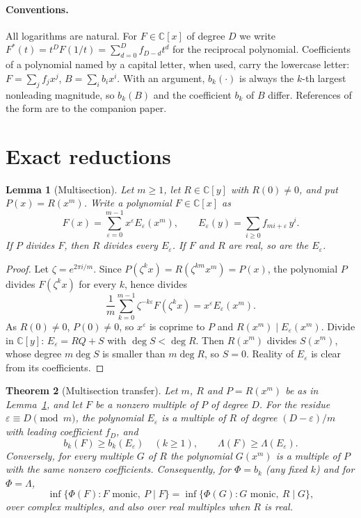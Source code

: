 \documentclass[11pt]{article}
\newtheorem{theorem}{Theorem}[section]
\newtheorem{lemma}[theorem]{Lemma}
\begin{document}
\paragraph{Conventions.}
All logarithms are natural.  For $F\in\mathbb C[x]$ of degree $D$ we write
$F^*(t)=t^DF(1/t)=\sum_{d=0}^Df_{D-d}t^d$ for the reciprocal polynomial.
Coefficients of a polynomial named by a capital letter, when used, carry the
lowercase letter: $F=\sum_jf_jx^j$, $B=\sum_ib_ix^i$.  With an argument,
$b_k(\cdot)$ is always the $k$-th largest nonleading magnitude, so $b_k(B)$
and the coefficient $b_k$ of $B$ differ.
References of the form \cite[Theorem~3.2]{coefficient-mass} are to the
companion paper.

\section{Exact reductions}\label{sec:exact}

\begin{lemma}[Multisection]\label{lem:multisection}
Let $m\ge1$, let $R\in\mathbb C[y]$ with $R(0)\ne0$, and put $P(x)=R(x^m)$.  Write
a polynomial $F\in\mathbb C[x]$ as
\[
  F(x)=\sum_{\varepsilon=0}^{m-1}x^\varepsilon E_\varepsilon(x^m),
  \qquad E_\varepsilon(y)=\sum_{i\ge0}f_{mi+\varepsilon}\,y^i .
\]
If $P$ divides $F$, then $R$ divides every $E_\varepsilon$.  If $F$ and $R$
are real, so are the $E_\varepsilon$.
\end{lemma}

\begin{proof}
Let $\zeta=e^{2\pi i/m}$.  Since $P(\zeta^kx)=R(\zeta^{km}x^m)=P(x)$, the
polynomial $P$ divides $F(\zeta^kx)$ for every $k$, hence divides
\[
  \frac1m\sum_{k=0}^{m-1}\zeta^{-k\varepsilon}F(\zeta^kx)
  =x^\varepsilon E_\varepsilon(x^m).
\]
As $R(0)\ne0$, $P(0)\ne0$, so $x^\varepsilon$ is coprime to $P$ and
$R(x^m)\mid E_\varepsilon(x^m)$.  Divide in $\mathbb C[y]$:
$E_\varepsilon=RQ+S$ with $\deg S<\deg R$.  Then $R(x^m)$ divides
$S(x^m)$, whose degree $m\deg S$ is smaller than $m\deg R$, so $S=0$.
Reality of $E_\varepsilon$ is clear from its coefficients.
\end{proof}

\begin{theorem}[Multisection transfer]\label{thm:transfer}
Let $m$, $R$ and $P=R(x^m)$ be as in Lemma~\ref{lem:multisection}, and let
$F$ be a nonzero multiple of $P$ of degree $D$.  For the residue
$\varepsilon\equiv D\pmod m$, the polynomial $E_\varepsilon$ is a multiple of
$R$ of degree $(D-\varepsilon)/m$ with leading coefficient $f_D$, and
\[
  b_k(F)\ge b_k(E_\varepsilon)\quad(k\ge1),\qquad
  \Lambda(F)\ge\Lambda(E_\varepsilon).
\]
Conversely, for every multiple $G$ of $R$ the polynomial $G(x^m)$ is a
multiple of $P$ with the same nonzero coefficients.  Consequently, for
$\Phi=b_k$ (any fixed $k$) and for $\Phi=\Lambda$,
\[
  \inf\{\Phi(F):F\text{ monic},\ P\mid F\}
  =\inf\{\Phi(G):G\text{ monic},\ R\mid G\},
\]
over complex multiples, and also over real multiples when $R$ is real.
\end{theorem}
\end{document}
